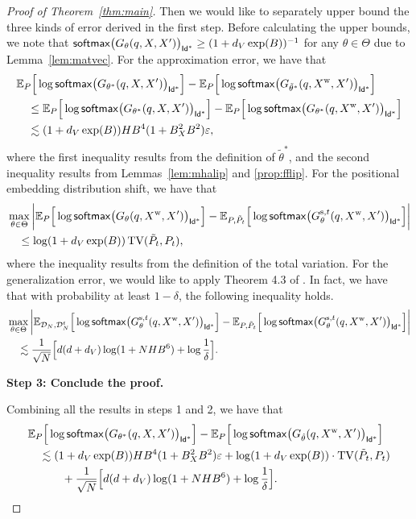 \begin{proof}[Proof of Theorem~\ref{thm:main}]
    Then we would like to separately upper bound the three kinds of error derived in the first step. Before calculating the upper bounds, we note that $\mathsf{softmax}\big( G_{\theta}(q,X,X^{\prime})\big)_{\mathsf{Id}^{*}}\geq (1+d_V\exp(B))^{-1}$ for any $\theta\in\Theta$ due to Lemma~\ref{lem:matvec}. For the approximation error, we have that
    \begin{align*}
        &\mathbb{E}_{P}\Big[\log \mathsf{softmax}\big( G_{\theta^{*}}(q,X,X^{\prime})\big)_{\mathsf{Id}^{*}}\Big] - \mathbb{E}_{P}\Big[\log \mathsf{softmax}\big( G_{\tilde{\theta}^{*}}(q,X^{\mathrm{w}},X^{\prime})\big)_{\mathsf{Id}^{*}}\Big]\nonumber\\
        &\quad \leq \mathbb{E}_{P}\Big[\log \mathsf{softmax}\big( G_{\theta^{*}}(q,X,X^{\prime})\big)_{\mathsf{Id}^{*}}\Big] - \mathbb{E}_{P}\Big[\log \mathsf{softmax}\big( G_{\theta^{*}}(q,X^{\mathrm{w}},X^{\prime})\big)_{\mathsf{Id}^{*}}\Big]\nonumber\\
        &\quad\lesssim (1+d_V\exp(B))HB^{4}(1+B_{X}^2B^2)\varepsilon,
    \end{align*}
    where the first inequality results from the definition of $\tilde{\theta}^{*}$, and the second inequality results from Lemmas~\ref{lem:mhalip} and \ref{prop:fflip}. For the positional embedding distribution shift, we have that
    \begin{align*}
         &\max_{\theta\in\Theta}\bigg|\mathbb{E}_{P}\Big[\log \mathsf{softmax}\big( G_{\theta}(q,X^{\mathrm{w}},X^{\prime})\big)_{\mathsf{Id}^{*}}\Big] -  \mathbb{E}_{P,\tilde{P}_{t}}\Big[\log \mathsf{softmax}\big( G_{\theta}^{\mathrm{s}, t}(q,X^{\mathrm{w}},X^{\prime})\big)_{\mathsf{Id}^{*}}\Big]\bigg|\nonumber\\
         &\quad \leq \log (1+d_V\exp(B))\mathop{\mathrm{TV}}(\tilde{P}_t,P_t),
    \end{align*}
    where the inequality results from the definition of the total variation. For the generalization error, we would like to apply Theorem 4.3 of \cite{zhang2023and}. In fact, we have that with probability at least $1-\delta$, the following inequality holds.
    \begin{align*}
        &\max_{\theta\in\Theta}\bigg|\mathbb{E}_{\mathcal{D}_N,\mathcal{D}_{N}^{t}}\Big[\log \mathsf{softmax}\big( G_{\theta}^{\mathrm{s},t}(q,X^{\mathrm{w}},X^{\prime})\big)_{\mathsf{Id}^{*}}\Big] - \mathbb{E}_{P,\tilde{P}_{t}}\Big[\log \mathsf{softmax}\big( G_{\theta}^{\mathrm{s},t}(q,X^{\mathrm{w}},X^{\prime})\big)_{\mathsf{Id}^{*}}\Big]\bigg|\nonumber\\
        &\quad \lesssim\frac{1}{\sqrt{N}}\Big[d(d+d_V)\log (1+NHB^6)+\log\frac{1}{\delta}\Big].
    \end{align*}

    \textbf{Step 3: Conclude the proof.}

    Combining all the results in steps 1 and 2, we have that
    \begin{align*}
        &\mathbb{E}_{P}\Big[\log \mathsf{softmax}\big( G_{\theta^{*}}(q,X,X^{\prime})\big)_{\mathsf{Id}^{*}}\Big]- \mathbb{E}_{P}\Big[\log \mathsf{softmax}\big( G_{\hat{\theta}}(q,X^{\mathrm{w}},X^{\prime})\big)_{\mathsf{Id}^{*}}\Big]\nonumber\\
        &\quad \lesssim (1+d_V\exp(B))HB^{4}(1+B_{X}^2B^2)\varepsilon + \log (1+d_V\exp(B))\cdot \mathop{\mathrm{TV}}(\tilde{P}_t,P_t)\nonumber\\
        &\quad\qquad + \frac{1}{\sqrt{N}}\Big[d(d+d_V)\log (1+NHB^6)+\log\frac{1}{\delta}\Big].
    \end{align*}
\end{proof}

